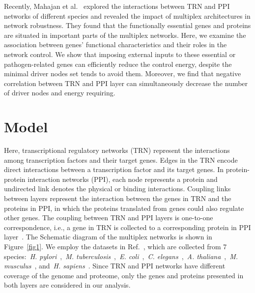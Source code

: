 \documentclass[%
 reprint,
 amsmath,amssymb,
 aps,
]{revtex4-2}
\begin{document}
Recently, Mahajan et al.~\cite{mahajan2021internetwork} explored the interactions between TRN and PPI networks of different species and revealed the impact of  multiplex architectures in network robustness. They found that the functionally essential genes and proteins are situated in important parts of the multiplex networks. Here, we examine the association between genes' functional characteristics and their roles in the network control. We show that imposing external inputs to these essential or pathogen-related genes can efficiently reduce the control energy, despite the minimal driver nodes set tends to avoid them. Moreover, we find that negative correlation between TRN and PPI layer can simultaneously decrease the number of driver nodes and energy requiring.  

\section{Model}
Here, transcriptional regulatory networks (TRN) represent the interactions among transcription factors and their target genes. Edges in the TRN encode direct interactions between a transcription factor and its target genes. In protein-protein interaction networks (PPI), each node represents a protein and undirected link denotes the physical or binding interactions. Coupling links between layers represent the interaction between the genes in TRN and the proteins in PPI, in which the proteins translated from genes could also regulate other genes. The coupling between TRN and PPI layers is one-to-one correspondence, i.e., a gene in TRN is collected to a corresponding protein in PPI layer~\cite{mahajan2021internetwork}. The Schematic diagram of the multiplex networks is shown in Figure~\ref{fig1}. We employ the datasets in Ref.~\cite{mahajan2021internetwork}, which are collected from 7 species:~\emph{H. pylori}~\cite{danielli2010built,hauser2014second},~\emph{M. tuberculosis}~\cite{sanz2011transcriptional,wang2010global},~\emph{E. coli}~\cite{salgado2018using,rajagopala2014binary,das2012hint},~\emph{C. elegans}~\cite{das2012hint,chatr2017biogrid,fuxman2016gene},~\emph{A. thaliana}~\cite{das2012hint,chatr2017biogrid,jin2015arabidopsis},~\emph{M. musculus}~\cite{das2012hint,chatr2017biogrid,han2018trrust}, and~\emph{H. sapiens}~\cite{das2012hint,chatr2017biogrid,han2018trrust}. Since TRN and PPI networks have different coverage of the genome and proteome, only the genes and proteins presented in both layers are considered in our analysis. 
\end{document}

